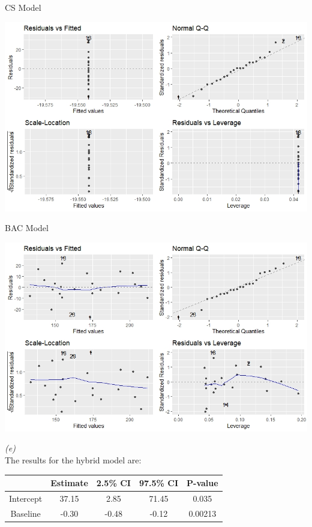 \documentclass[11pt,a4paper]{article}
\begin{document}
\begin{center}
CS Model

\includegraphics[scale = 0.7]{cs_model_resid.jpeg}
\end{center}

\begin{center}
BAC Model

\includegraphics[scale = 0.7]{bs_model_resid.jpeg}
\end{center}

\textit{(e)}\\

The results for the hybrid model are:

\begin{table}[ht]
\centering
\begin{tabular}{c|c|c|c|c|}
\cline{2-5}
                                & Estimate & 2.5\% CI & 97.5\% CI & P-value \\ \hline
\multicolumn{1}{|c|}{Intercept} & 37.15    & 2.85     & 71.45     & 0.035   \\ \hline
\multicolumn{1}{|c|}{Baseline}  & -0.30    & -0.48    & -0.12     & 0.00213 \\ \hline
\end{tabular}
\end{table}
\end{document}
